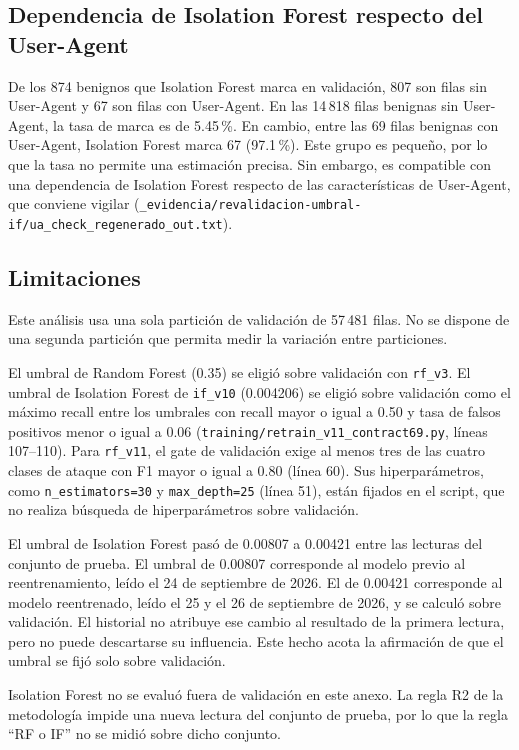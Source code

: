 \subsection{Dependencia de Isolation Forest respecto del User-Agent}

De los 874 benignos que Isolation Forest marca en validación, 807 son filas sin User-Agent y 67 son filas con User-Agent. En las 14\,818 filas benignas sin User-Agent, la tasa de marca es de 5.45\,\%. En cambio, entre las 69 filas benignas con User-Agent, Isolation Forest marca 67 (97.1\,\%). Este grupo es pequeño, por lo que la tasa no permite una estimación precisa. Sin embargo, es compatible con una dependencia de Isolation Forest respecto de las características de User-Agent, que conviene vigilar (\texttt{\_evidencia/revalidacion-umbral-if/ua\_check\_regenerado\_out.txt}).

\subsection{Limitaciones}

Este análisis usa una sola partición de validación de 57\,481 filas. No se dispone de una segunda partición que permita medir la variación entre particiones.

El umbral de Random Forest (0.35) se eligió sobre validación con \texttt{rf\_v3}. El umbral de Isolation Forest de \texttt{if\_v10} (0.004206) se eligió sobre validación como el máximo recall entre los umbrales con recall mayor o igual a 0.50 y tasa de falsos positivos menor o igual a 0.06 (\texttt{training/retrain\_v11\_contract69.py}, líneas 107--110). Para \texttt{rf\_v11}, el gate de validación exige al menos tres de las cuatro clases de ataque con F1 mayor o igual a 0.80 (línea 60). Sus hiperparámetros, como \texttt{n\_estimators=30} y \texttt{max\_depth=25} (línea 51), están fijados en el script, que no realiza búsqueda de hiperparámetros sobre validación.

El umbral de Isolation Forest pasó de 0.00807 a 0.00421 entre las lecturas del conjunto de prueba. El umbral de 0.00807 corresponde al modelo previo al reentrenamiento, leído el 24 de septiembre de 2026. El de 0.00421 corresponde al modelo reentrenado, leído el 25 y el 26 de septiembre de 2026, y se calculó sobre validación. El historial no atribuye ese cambio al resultado de la primera lectura, pero no puede descartarse su influencia. Este hecho acota la afirmación de que el umbral se fijó solo sobre validación.

Isolation Forest no se evaluó fuera de validación en este anexo. La regla R2 de la metodología impide una nueva lectura del conjunto de prueba, por lo que la regla ``RF o IF'' no se midió sobre dicho conjunto.

